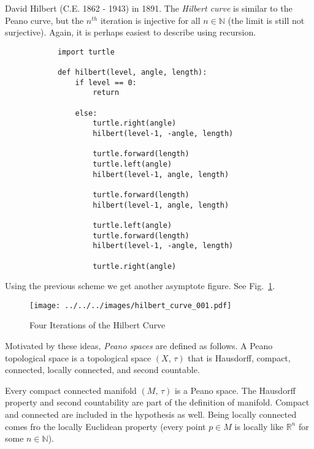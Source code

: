 \documentclass{article}
\theoremstyle{plain}
\theoremstyle{normal}
\newenvironment{example}{%
    \pushQED{\qed}\renewcommand{\qedsymbol}{$\blacksquare$}\examplex%
}{%
    \popQED\endexamplex%
}
\newenvironment{definition}{%
    \pushQED{\qed}\renewcommand{\qedsymbol}{$\blacksquare$}\definitionx%
}{%
    \popQED\enddefinitionx%
}
\begin{document}
        David Hilbert (C.E. 1862 - 1943) in 1891. The
        \textit{Hilbert curve}
        is similar to the Peano curve, but the $n^{th}$ iteration is injective
        for all $n\in\mathbb{N}$ (the limit is still not surjective). Again,
        it is perhaps easiest to describe using recursion.
        \begin{verbatim}
            import turtle

            def hilbert(level, angle, length):
                if level == 0:
                    return

                else:
                    turtle.right(angle)
                    hilbert(level-1, -angle, length)
             
                    turtle.forward(length)
                    turtle.left(angle)
                    hilbert(level-1, angle, length)
             
                    turtle.forward(length)
                    hilbert(level-1, angle, length)

                    turtle.left(angle)
                    turtle.forward(length)
                    hilbert(level-1, -angle, length)

                    turtle.right(angle)
        \end{verbatim}
        Using the previous scheme we get another asymptote figure. See
        Fig.~\ref{fig:hilber_curve_001}.
        \begin{figure}
            \centering
            \texttt{[image: ../../../images/hilbert\_curve\_001.pdf]}
            \caption{Four Iterations of the Hilbert Curve}
            \label{fig:hilber_curve_001}
        \end{figure}
        Motivated by these ideas, \textit{Peano spaces}
        are defined as follows.
        \begin{definition}[Peano Space]
            A Peano topological space is a topological space $(X,\,\tau)$
            that is Hausdorff, compact, connected, locally connected, and
            second countable.
        \end{definition}
        \begin{example}
            Every compact connected manifold $(M,\,\tau)$ is a Peano space.
            The Hausdorff property and second countability are part of the
            definition of manifold. Compact and connected are included in the
            hypothesis as well. Being locally connected comes fro the locally
            Euclidean property (every point $p\in{M}$ is locally like
            $\mathbb{R}^{n}$ for some $n\in\mathbb{N}$).
        \end{example}
\end{document}
